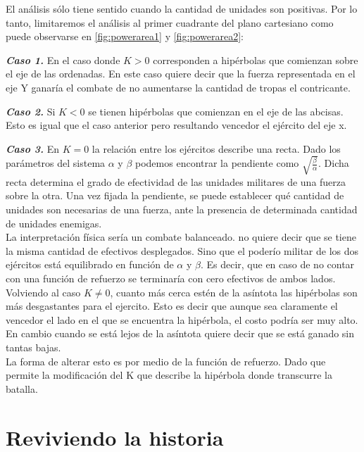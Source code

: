 \documentclass{sig-alternate}
\begin{document}
El an\'alisis s\'olo tiene sentido cuando la cantidad de unidades son positivas. Por lo tanto, limitaremos el an\'alisis al primer cuadrante del plano cartesiano como puede observarse en \ref{fig:powerarea1} y \ref{fig:powerarea2}:


\textbf{\textit{Caso 1.}} En el caso donde $K > 0$ corresponden a hip\'erbolas que comienzan
sobre el eje de las ordenadas. En este caso quiere decir que la fuerza representada
en el eje Y ganar\'ia el combate de no aumentarse la cantidad de tropas
el contricante.


\textbf{\textit{Caso 2.}} Si $K<0$ se tienen hip\'erbolas que comienzan
en el eje de las abcisas. Esto es igual que el caso anterior pero resultando vencedor el ejército del eje x.

\textbf{\textit{Caso 3.}} 
En $K=0$ la relación entre los ejércitos describe una recta. Dado los parámetros del sistema $\alpha$ y $\beta$ podemos encontrar la pendiente como $\sqrt{\frac{\beta}{\alpha}}$. Dicha recta determina el grado de efectividad de las unidades militares de una fuerza sobre la otra. Una vez fijada la pendiente, se puede 
establecer qué cantidad de unidades son necesarias de una fuerza, ante la presencia de determinada cantidad de unidades enemigas.  \\
La interpretación f\'isica ser\'ia un combate balanceado. no quiere decir que se tiene la misma cantidad de efectivos desplegados. Sino que el poderío militar de los dos ej\'ercitos está equilibrado en función de $\alpha$ y $\beta$. Es decir, que en caso de no contar con una funci\'on de refuerzo se terminar\'ia con cero efectivos de ambos lados. \\
Volviendo al caso $K \ne 0$, cuanto m\'as cerca est\'en de la as\'intota las hip\'erbolas son m\'as desgastantes para el ejercito. Esto es decir que aunque sea claramente
el vencedor el lado en el que se encuentra la hip\'erbola, el costo
podr\'ia ser muy alto. En cambio cuando se está lejos de la as\'intota
quiere decir que se está ganado sin tantas bajas. \\
La forma de alterar esto es por medio de la función de refuerzo. Dado que permite la modificación del K que describe la hipérbola donde transcurre la batalla. 


\section{Reviviendo la historia}
\end{document}
